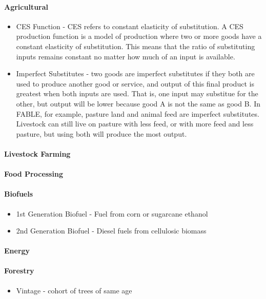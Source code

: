 \documentclass[10pt]{article}
\begin{document}
\paragraph{Agricultural}
\begin{itemize}
\item CES Function - CES refers to constant elasticity of substitution. A CES production function is a model of production where two or more goods have a constant elasticity of substitution. This means that the ratio of substituting inputs remains constant no matter how much of an input is available.  

\item Imperfect Substitutes - two goods are imperfect substitutes if they both are used to produce another good or service, and output of this final product is greatest when both inputs are used. That is, one input may substitue for the other, but output will be lower because good A is not the same as good B. In FABLE, for example, pasture land and animal feed are imperfect substitutes. Livestock can still live on pasture with less feed, or with more feed and less pasture, but using both will produce the most output. 

\end{itemize}
\paragraph{Livestock Farming}
\paragraph{Food Processing}
\paragraph{Biofuels}
\begin{itemize}
\item 1st Generation Biofuel - Fuel from corn or sugarcane ethanol
\item 2nd Generation Biofuel - Diesel fuels from cellulosic biomass
\end{itemize}
\paragraph{Energy}
\paragraph{Forestry}
\begin{itemize}
\item Vintage - cohort of trees of same age
\end{itemize}
\end{document}
